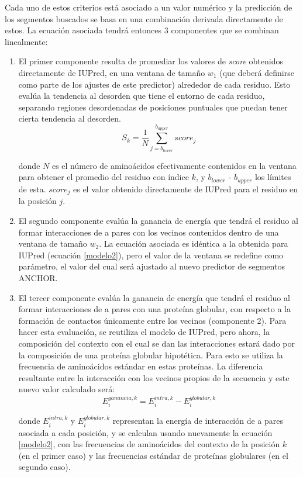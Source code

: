 Cada uno de estos criterios está asociado a un valor numérico y la predicción de los segmentos buscados se basa en una combinación derivada directamente de estos.
La ecuación asociada tendrá entonces 3 componentes que se combinan linealmente:
\begin{enumerate}
 \item El primer componente resulta de promediar los valores de \textit{score} obtenidos directamente de IUPred, en una ventana de tamaño $w_1$ (que deberá definirse como parte de los ajustes de este predictor) alrededor de cada residuo. 
Esto evalúa la tendencia al desorden que tiene el entorno de cada residuo, separando regiones desordenadas de posiciones puntuales que puedan tener cierta tendencia al desorden.
\begin{equation}\label{score1}
 S_k = \frac{1}{N} \sum_{j=b_{lower}}^{b_{upper}} score_j
\end{equation}

donde $N$ es el número de aminoácidos efectivamente contenidos en la ventana para obtener el promedio del residuo con índice $k$, y $b_{lower}$ - $b_{upper}$ los límites de esta.
$score_j$ es el valor obtenido directamente de IUPred para el residuo en la posición $j$.

\item El segundo componente evalúa la ganancia de energía que tendrá el residuo al formar interacciones de a pares con los vecinos contenidos dentro de una ventana de tamaño $w_2$. 
La ecuación asociada es idéntica a la obtenida para IUPred (ecuación \ref{modelo2}), pero el valor de la ventana se redefine como parámetro, el valor del cual será ajustado 
al nuevo predictor de segmentos ANCHOR.

\item El tercer componente evalúa la ganancia de energía que tendrá el residuo al formar interacciones de a pares con una proteína globular, 
con respecto a la formación de contactos únicamente entre los vecinos (componente 2). Para hacer esta evaluación, se reutiliza el modelo de IUPred, pero ahora, 
la composición del contexto con el cual se dan las interacciones estará dado por la composición de una proteína globular hipotética. 
Para esto se utiliza la frecuencia de aminoácidos estándar en estas proteínas.
La diferencia resultante entre la interacción con los vecinos propios de la secuencia y este nuevo valor calculado será:
\begin{equation}\label{score3}
E_i^{ganancia,k} = E_i^{intra,k} - E_i^{globular,k}
\end{equation}

\noindent donde $E_i^{intra,k}$ y $E_i^{globular,k}$ representan la energía de interacción de a pares asociada a cada posición, y se calculan usando nuevamente la ecuación \ref{modelo2}, 
con las frecuencias de aminoácidos del contexto de la posición $k$ (en el primer caso) y las frecuencias estándar de proteínas globulares (en el segundo caso).
\end{enumerate}

